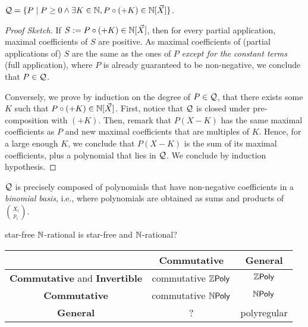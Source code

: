\documentclass[a4paper,11pt]{article}
\begin{document}
\begin{conjecture}
    $\mathcal{Q} = \mathopen{\{} P \mid  P \geq 0 \wedge \exists K \in \mathbb{N}, P \circ (+K) \in \mathbb{N}[\vec{X}] \mathclose{\}}$.
\end{conjecture}
\begin{proof}[Proof Sketch]
    If $S \mathrel{:=} P \circ (+K) \in \mathbb{N}[\vec{X}]$, then for every partial application,
    maximal coefficients of $S$ are positive. As maximal coefficients of 
    (partial applications of) $S$ are the same as the ones of $P$
    \emph{except for the constant terms} (full application),
    where $P$ is already guaranteed to be non-negative, we conclude
    that $P \in \mathcal{Q}$.

    Conversely, we prove by induction on the degree of $P \in \mathcal{Q}$,
    that there exists some $K$ such that $P \circ (+K) \in \mathbb{N}[\vec{X}]$.
    First, notice that $\mathcal{Q}$ is closed under pre-composition with
    $(+K)$. Then, remark that $P(X - K)$ has the same maximal coefficients as
    $P$ and new maximal coefficients that are multiples of $K$. Hence, for a
    large enough $K$, we conclude that $P(X - K)$ is the sum of its maximal
    coefficients, plus a polynomial that lies in $\mathcal{Q}$. We conclude by
    induction hypothesis. 
\end{proof}

\begin{conjecture}
    $\mathcal{Q}$ is precisely composed of polynomials that
    have non-negative coefficients in a \emph{binomial basis},
    i.e., where polynomials are obtained
    as sums and products of $\binom{X_i}{p_i}$.
\end{conjecture}

\begin{conjecture}
    star-free $\mathbb{N}$-rational is star-free and $\mathbb{N}$-rational?
\end{conjecture}


\begin{center}
    \begin{tabular}{c|cc}
        \toprule
        & \textbf{Commutative} & \textbf{General} \\
        \midrule
        \textbf{Commutative}
        and \textbf{Invertible} & commutative $\ZPoly$ & $\ZPoly$ \\
        \textbf{Commutative} & commutative $\NPoly$ & $\NPoly$ \\
        \textbf{General} & ? & polyregular 
    \end{tabular}
\end{center}


\printbibliography

\appendix
\end{document}
